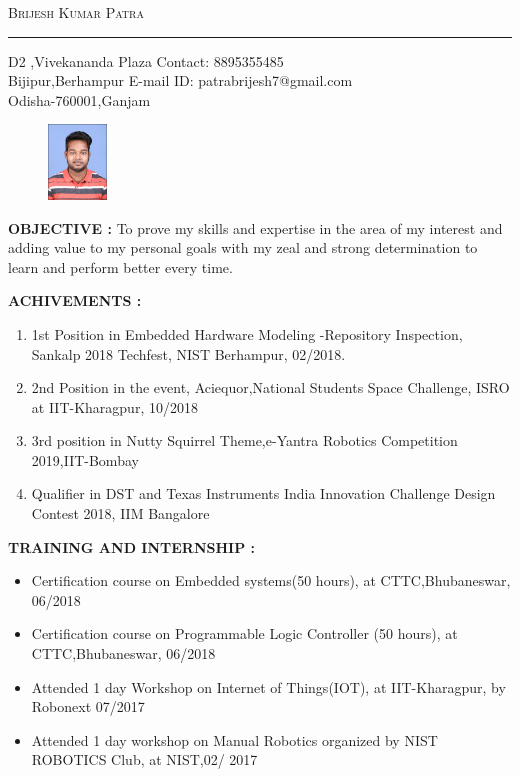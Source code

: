 \documentclass[a4]{article}
\begin{document}
\setlength{\parindent}{0em}

\centerline{
\textsc{\LARGE Brijesh Kumar Patra}
}

\vspace{5mm}
\hrule
\vspace{2mm}

D2 ,Vivekananda Plaza \hspace{7.4cm} Contact: 8895355485\\
Bijipur,Berhampur \hspace{8.2cm} E-mail ID: patrabrijesh7@gmail.com\\
Odisha-760001,Ganjam

\begin{figure}[h!]
\hspace{10.5cm}
\includegraphics[height=2cm]{Resume_pic}
\end{figure}

\vspace{3mm}
\textbf{OBJECTIVE : }
To prove my skills and expertise in the area of my interest and adding value to my personal  goals with my zeal and strong determination to learn and perform better every time.

\vspace{5mm}
\textbf{ACHIVEMENTS : } 
\vspace{1mm}\\
\begin{enumerate}
\item 1st Position in Embedded Hardware Modeling -Repository Inspection, Sankalp 2018 Techfest, NIST Berhampur, 02/2018.
\item 2nd  Position in the event, Aciequor,National Students Space Challenge, ISRO at IIT-Kharagpur, 10/2018

\item 3rd position in Nutty Squirrel Theme,e-Yantra Robotics Competition 2019,IIT-Bombay
\item Qualifier in DST and Texas Instruments India Innovation Challenge Design Contest 2018, IIM Bangalore
\end{enumerate}

\vspace{3mm}
\textbf{TRAINING AND INTERNSHIP : } 
\begin{itemize}
	\item Certification course on Embedded systems(50 hours), at CTTC,Bhubaneswar, 06/2018
	\item Certification course on  Programmable Logic Controller (50 hours), at CTTC,Bhubaneswar, 06/2018
          \item Attended 1 day Workshop on Internet of Things(IOT), at IIT-Kharagpur, by Robonext 07/2017
          \item  Attended 1 day workshop on Manual Robotics organized by NIST ROBOTICS Club, at  NIST,02/ 2017
\end{itemize}
\end{document}
